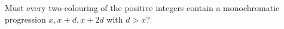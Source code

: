 Must every two-colouring of the positive integers contain a monochromatic
progression \(x,x+d,x+2d\) with \(d>x\)?

